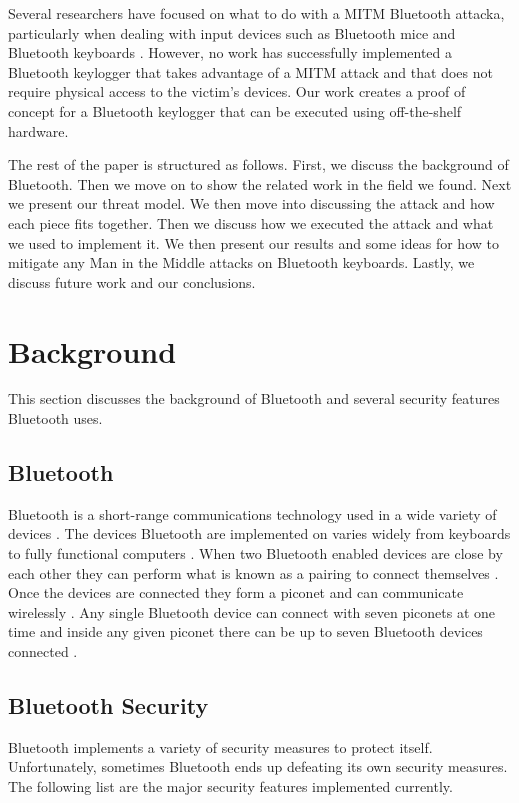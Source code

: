 \documentclass{acm_proc_article-sp}
\begin{document}
Several researchers have focused on what to do with a MITM Bluetooth attacka, particularly when dealing with input devices such as Bluetooth mice \cite{btmice} and Bluetooth keyboards \cite{cuthbertbluetooth,ma2007keystroke}. However, no work has successfully implemented a Bluetooth keylogger that takes advantage of a MITM attack and that does not require physical access to the victim's devices. Our work creates a proof of concept for a Bluetooth keylogger that can be executed using off-the-shelf hardware. 

The rest of the paper is structured as follows. First, we discuss the background of Bluetooth. Then we move on to show the related work in the field we found. Next we present our threat model. We then move into discussing the attack and how each piece fits together. Then we discuss how we executed the attack and what we used to implement it. We then present our results and some ideas for how to mitigate any Man in the Middle attacks on Bluetooth keyboards. Lastly, we discuss future work and our conclusions.

\section{Background}
This section discusses the background of Bluetooth and several security features Bluetooth uses.

\subsection{Bluetooth}
Bluetooth is a short-range communications technology used in a wide variety of devices \cite{bluetooth}. The devices Bluetooth are implemented on varies widely from keyboards to fully functional computers \cite{bluetooth}. When two Bluetooth enabled devices are close by each other they can perform what is known as a pairing to connect themselves \cite{bluetooth}. Once the devices are connected they form a piconet and can communicate wirelessly \cite{bluetooth}. Any single Bluetooth device can connect with seven piconets at one time and inside any given piconet there can be up to seven Bluetooth devices connected \cite{bluetooth}. 

\subsection{Bluetooth Security}
Bluetooth implements a variety of security measures to protect itself. Unfortunately, sometimes Bluetooth ends up defeating its own security measures. The following list are the major security features implemented currently.
\end{document}
